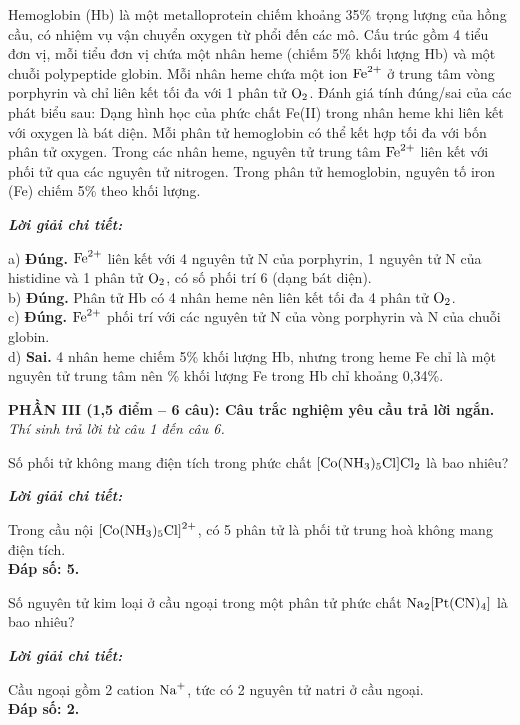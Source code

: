 \documentclass[11pt,a4paper]{article}
\def\loigiai#1{
\par\begingroup\color{blue!80!black}\small
\noindent\textbf{\textit{Lời giải chi tiết:}}\par
#1\par\endgroup}
\begin{document}
\begin{ex}
Hemoglobin (Hb) là một metalloprotein chiếm khoảng 35\% trọng lượng của hồng cầu, có nhiệm vụ vận chuyển oxygen từ phổi đến các mô. Cấu trúc gồm 4 tiểu đơn vị, mỗi tiểu đơn vị chứa một nhân heme (chiếm 5\% khối lượng Hb) và một chuỗi polypeptide globin. Mỗi nhân heme chứa một ion $\ce{Fe^2+}$ ở trung tâm vòng porphyrin và chỉ liên kết tối đa với 1 phân tử $\ce{O2}$. Đánh giá tính đúng/sai của các phát biểu sau:
\choiceTF
{\True Dạng hình học của phức chất Fe(II) trong nhân heme khi liên kết với oxygen là bát diện.}
{\True Mỗi phân tử hemoglobin có thể kết hợp tối đa với bốn phân tử oxygen.}
{\True Trong các nhân heme, nguyên tử trung tâm $\ce{Fe^2+}$ liên kết với phối tử qua các nguyên tử nitrogen.}
{Trong phân tử hemoglobin, nguyên tố iron (Fe) chiếm 5\% theo khối lượng.}
\loigiai{
a) \textbf{Đúng.} $\ce{Fe^2+}$ liên kết với 4 nguyên tử N của porphyrin, 1 nguyên tử N của histidine và 1 phân tử $\ce{O2}$, có số phối trí 6 (dạng bát diện).\\
b) \textbf{Đúng.} Phân tử Hb có 4 nhân heme nên liên kết tối đa 4 phân tử $\ce{O2}$.\\
c) \textbf{Đúng.} $\ce{Fe^2+}$ phối trí với các nguyên tử N của vòng porphyrin và N của chuỗi globin.\\
d) \textbf{Sai.} 4 nhân heme chiếm 5\% khối lượng Hb, nhưng trong heme Fe chỉ là một nguyên tử trung tâm nên \% khối lượng Fe trong Hb chỉ khoảng 0,34\%.
}
\end{ex}



\noindent
\textbf{PHẦN III (1,5 điểm -- 6 câu): Câu trắc nghiệm yêu cầu trả lời ngắn.}\\
\textit{Thí sinh trả lời từ câu 1 đến câu 6.}

\setcounter{ex}{0}

\begin{ex}
Số phối tử không mang điện tích trong phức chất $\ce{[Co(NH3)5Cl]Cl2}$ là bao nhiêu?
\loigiai{
Trong cầu nội $\ce{[Co(NH3)5Cl]^2+}$, có 5 phân tử \ce{NH3} là phối tử trung hoà không mang điện tích.\\
\textbf{Đáp số: 5.}}
\end{ex}


\begin{ex}
Số nguyên tử kim loại ở cầu ngoại trong một phân tử phức chất $\ce{Na2[Pt(CN)4]}$ là bao nhiêu?
\loigiai{
Cầu ngoại gồm 2 cation $\ce{Na+}$, tức có 2 nguyên tử natri ở cầu ngoại.\\
\textbf{Đáp số: 2.}}
\end{ex}
\end{document}

